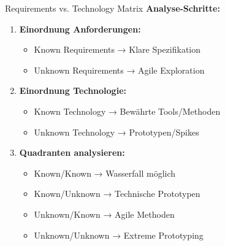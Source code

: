 \begin{KR}{Requirements vs. Technology Matrix}
\textbf{Analyse-Schritte:}
\begin{enumerate}
    \item \textbf{Einordnung Anforderungen:}
    \begin{itemize}
        \item Known Requirements → Klare Spezifikation
        \item Unknown Requirements → Agile Exploration
    \end{itemize}
    
    \item \textbf{Einordnung Technologie:}
    \begin{itemize}
        \item Known Technology → Bewährte Tools/Methoden
        \item Unknown Technology → Prototypen/Spikes
    \end{itemize}
    
    \item \textbf{Quadranten analysieren:}
    \begin{itemize}
        \item Known/Known → Wasserfall möglich
        \item Known/Unknown → Technische Prototypen
        \item Unknown/Known → Agile Methoden
        \item Unknown/Unknown → Extreme Prototyping
    \end{itemize}
\end{enumerate}
\end{KR}

